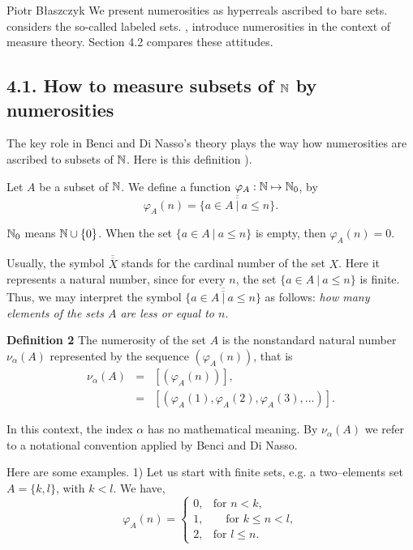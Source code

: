 \begin{artengenv}{Piotr Błaszczyk}
We present numerosities as hyperreals ascribed to bare sets.  \parencite{ref_BN19} considers the so-called labeled sets.  \parencite{ref_BN14}, \parencite{ref_BN15} introduce numerosities in the context of  measure theory. Section 4.2 compares these attitudes.

\subsection{4.1. How to measure subsets of  ${\mathbb{N}}$ by numerosities}
 The key role in  Benci and Di Nasso's theory plays the way how numerosities are ascribed to subsets of ${\mathbb{N}}$.
 Here is this definition \parencite[279]{ref_BN19}).

Let $A$ be a subset of ${\mathbb{N}}$. We define a function
$\varphi_A:{\mathbb{N}}\mapsto{\mathbb{N}}_0$, by
\begin{equation}\varphi_A(n)=\overline{\overline{\{a\in A\ |\ a\leq n\}}}.\end{equation}

${\mathbb{N}}_0$ means ${\mathbb{N}}\cup\{0\}$. When the set   $\{a\in A\ |\ a\leq n\}$ is empty, then $\varphi_A(n)=0$.

Usually, the symbol  $\overline{\overline{X}}$ stands for the cardinal number of the set $X$. Here it represents a   natural number, since for  every $n$, the set $\{a\in A\ |\ a\leq n\}$ is finite. Thus, we may interpret the symbol $\overline{\overline{\{a\in A\ |\ a\leq n\}}}$ as follows: \textit{how many elements of the sets $A$ are less or equal to $n$}.



\textbf{Definition 2} \parencite[280]{ref_BN19} The numerosity of the set $A$ is the nonstandard natural number $\nu_\alpha (A)$ represented by the sequence $(\varphi_A(n))$, that is
\begin{eqnarray*}\nu_\alpha (A) &=& [(\varphi_A(n))],\\
                                   &=& [(\varphi_A(1), \varphi_A(2), \varphi_A(3),...)].
                                                         \end{eqnarray*}

In this context, the index $\alpha$ has no mathematical meaning. By $\nu_\alpha (A)$ we refer to a notational convention applied by Benci and Di Nasso. 


Here are some examples. 1) Let us start  with  finite sets, e.g. a  two--elements set
 $A=\{k, l\}$, with $k<l$. We have,
\[\varphi_A(n)=
\left\{\begin{array}{ccc}
0, & \mbox{for $n<k$}, \\
1, & \ \ \ \ \ \mbox{for $k\leq n<l$},\\
2,  & \mbox{for $l\leq n$}.
\end{array} \right.\]




\end{artengenv}

